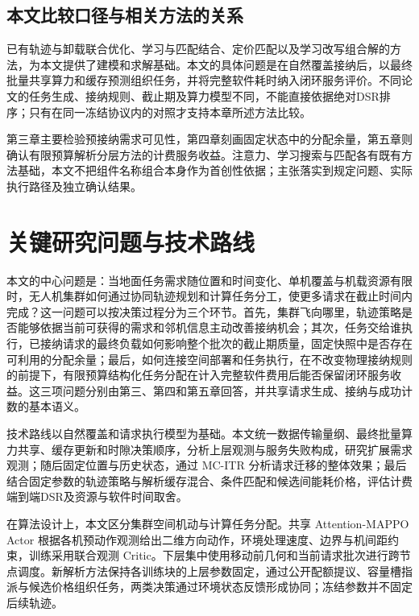 \subsection{本文比较口径与相关方法的关系}
\label{sec:ch1-recent-advances}
已有轨迹与卸载联合优化、学习与匹配结合、定价匹配以及学习改写组合解的方法，为本文提供了建模和求解基础\cite{ju2024multi,wang2025matching,sun2025tjcct,chen2019rewriting}。本文的具体问题是在自然覆盖接纳后，以最终批量共享算力和缓存预测组织任务，并将完整软件耗时纳入闭环服务评价。不同论文的任务生成、接纳规则、截止期及算力模型不同，不能直接依据绝对DSR排序；只有在同一冻结协议内的对照才支持本章所述方法比较。

第三章主要检验预接纳需求可见性，第四章刻画固定状态中的分配余量，第五章则确认有限预算解析分层方法的计费服务收益。注意力、学习搜索与匹配各有既有方法基础，本文不把组件名称组合本身作为首创性依据；主张落实到规定问题、实际执行路径及独立确认结果。

\section{关键研究问题与技术路线}
\label{sec:ch1-questions}

本文的中心问题是：当地面任务需求随位置和时间变化、单机覆盖与机载资源有限时，无人机集群如何通过协同轨迹规划和计算任务分工，使更多请求在截止时间内完成？这一问题可以按决策过程分为三个环节。首先，集群飞向哪里，轨迹策略是否能够依据当前可获得的需求和邻机信息主动改善接纳机会；其次，任务交给谁执行，已接纳请求的最终负载如何影响整个批次的截止期质量，固定快照中是否存在可利用的分配余量；最后，如何连接空间部署和任务执行，在不改变物理接纳规则的前提下，有限预算结构化任务分配在计入完整软件费用后能否保留闭环服务收益。这三项问题分别由第三、第四和第五章回答，并共享请求生成、接纳与成功计数的基本语义。

技术路线以自然覆盖和请求执行模型为基础。本文统一数据传输量纲、最终批量算力共享、缓存更新和时隙决策顺序，分析上层观测与服务失败构成，研究扩展需求观测；随后固定位置与历史状态，通过 MC-ITR 分析请求迁移的整体效果；最后结合固定参数的轨迹策略与解析缓存混合、条件匹配和候选间能耗价格，评估计费端到端DSR及资源与软件时间取舍。

在算法设计上，本文区分集群空间机动与计算任务分配。共享 Attention-MAPPO Actor 根据各机预动作观测给出二维方向动作，环境处理速度、边界与机间距约束，训练采用联合观测 Critic。下层集中使用移动前几何和当前请求批次进行跨节点调度。新解析方法保持各训练块的上层参数固定，通过公开配额提议、容量槽指派与候选价格组织任务，两类决策通过环境状态反馈形成协同；冻结参数并不固定后续轨迹。

